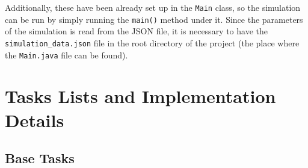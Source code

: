 \documentclass[10pt, a4paper]{scrartcl}
\begin{document}
\begin{multicols}{2}
        \noindent Additionally, these have been already set up in the \verb|Main| class, so the simulation can be run by simply running
        the \verb|main()| method under it. Since the parameters of the simulation is read from the JSON file, it is necessary
        to have the \verb|simulation_data.json| file in the root directory of the project (the place where the \verb|Main.java|
        file can be found).

        \section{Tasks Lists and Implementation Details}

        \subsection{Base Tasks}


\end{multicols}
\end{document}
